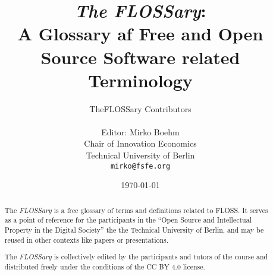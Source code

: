 \documentclass[a4paper]{article}
\title{{\em The FLOSSary}:\\
  A Glossary af Free and Open Source Software related Terminology}
\author{TheFLOSSary Contributors\\
  \\
  Editor: Mirko Boehm\\
  Chair of Innovation Economics\\
  Technical University of Berlin\\
  \texttt{mirko@fsfe.org}}
\date{\today}
\begin{document}
\newcommand{\flossary}{{\em FLOSSary} }

\maketitle \thispagestyle{empty}
\begin{abstract}
  \noindent
  The \flossary is a free glossary of terms and definitions related to
  \gls{FLOSS}. It serves as a point of reference for the participants
  in the ``Open Source and Intellectual Property in the Digital
  Society'' the the Technical University of Berlin, and may be reused
  in other contexts like papers or presentations.

  The \flossary is
  collectively edited by the participants and tutors of the course and
  distributed freely under the conditions of the CC BY 4.0 license.
\end{abstract}

\clearpage
\glsaddall
\printnoidxglossary[nonumberlist]
\clearpage
\printnoidxglossary[type=\acronymtype,nonumberlist]
\clearpage

\end{document}
